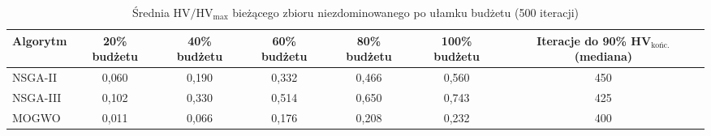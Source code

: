 \begin{table}[htbp]
    \centering
    \caption{Średnia $\mathrm{HV}/\mathrm{HV}_{\max}$ bieżącego zbioru niezdominowanego po ułamku budżetu (500 iteracji)}
    \label{tab:convergence}
    \begin{tabular}{l c c c c c c}
        \hline
        Algorytm & 20\% budżetu & 40\% budżetu & 60\% budżetu & 80\% budżetu & 100\% budżetu & Iteracje do 90\% HV$_{\text{końc.}}$ (mediana) \\
        \hline
        NSGA-II & 0{,}060 & 0{,}190 & 0{,}332 & 0{,}466 & 0{,}560 & 450 \\
        NSGA-III & 0{,}102 & 0{,}330 & 0{,}514 & 0{,}650 & 0{,}743 & 425 \\
        MOGWO & 0{,}011 & 0{,}066 & 0{,}176 & 0{,}208 & 0{,}232 & 400 \\
        \hline
    \end{tabular}
\end{table}
